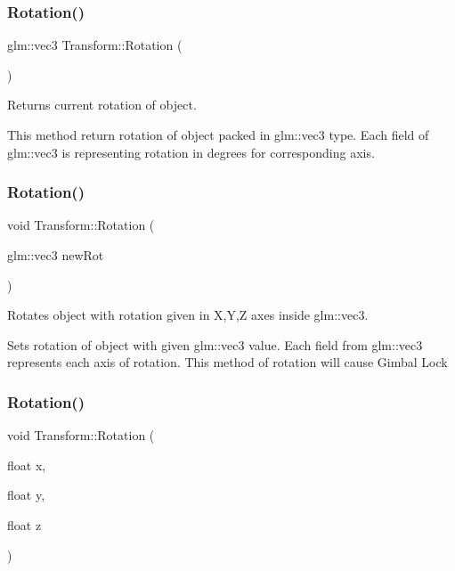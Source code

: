 \subsubsection{\texorpdfstring{Rotation()}{Rotation()}\hspace{0.1cm}{\footnotesize\ttfamily [1/3]}}
{\footnotesize\ttfamily glm\+::vec3 Transform\+::\+Rotation (\begin{DoxyParamCaption}{ }\end{DoxyParamCaption})\hspace{0.3cm}{\ttfamily [inline]}}



Returns current rotation of object. 

This method return rotation of object packed in glm\+::vec3 type. Each field of glm\+::vec3 is representing rotation in degrees for corresponding axis. \mbox{\label{class_transform_ae19384ad3a8fc19d997bab8be905eb8a}} 
\subsubsection{\texorpdfstring{Rotation()}{Rotation()}\hspace{0.1cm}{\footnotesize\ttfamily [2/3]}}
{\footnotesize\ttfamily void Transform\+::\+Rotation (\begin{DoxyParamCaption}\item[{glm\+::vec3}]{new\+Rot }\end{DoxyParamCaption})\hspace{0.3cm}{\ttfamily [inline]}}



Rotates object with rotation given in X,Y,Z axes inside glm\+::vec3. 

Sets rotation of object with given glm\+::vec3 value. Each field from glm\+::vec3 represents each axis of rotation. This method of rotation will cause Gimbal Lock \mbox{\label{class_transform_a08eb7ce459e2be8c180741f29990583a}} 
\subsubsection{\texorpdfstring{Rotation()}{Rotation()}\hspace{0.1cm}{\footnotesize\ttfamily [3/3]}}
{\footnotesize\ttfamily void Transform\+::\+Rotation (\begin{DoxyParamCaption}\item[{float}]{x,  }\item[{float}]{y,  }\item[{float}]{z }\end{DoxyParamCaption})\hspace{0.3cm}{\ttfamily [inline]}}



